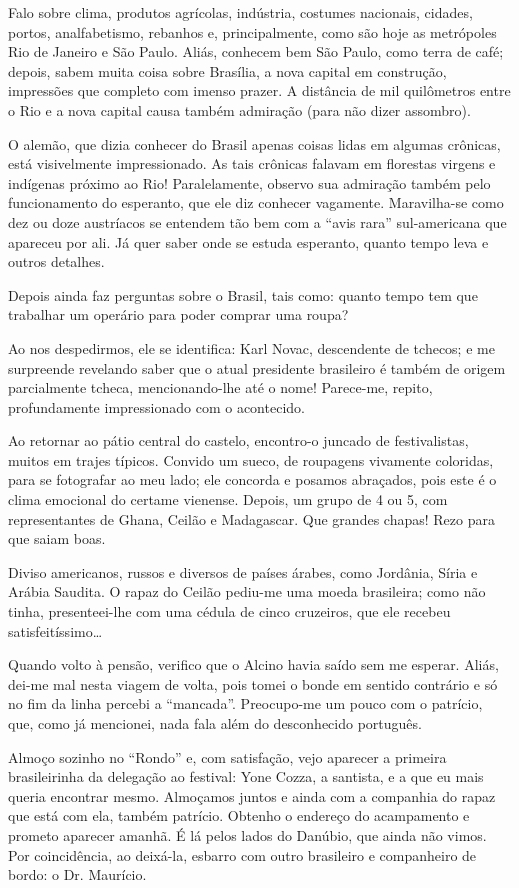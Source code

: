 Falo sobre clima, produtos agrícolas, indústria, costumes nacionais, cidades, portos, analfabetismo, rebanhos e, principalmente, como são hoje as metrópoles Rio de Janeiro e São Paulo. Aliás, conhecem bem São Paulo, como terra de café; depois, sabem muita coisa sobre Brasília, a nova capital em construção, impressões que completo com imenso prazer. A distância de mil quilômetros entre o Rio e a nova capital causa também admiração (para não dizer assombro).

O alemão, que dizia conhecer do Brasil apenas coisas lidas em algumas crônicas, está visivelmente impressionado. As tais crônicas falavam em florestas virgens e indígenas próximo ao Rio! Paralelamente, observo sua admiração também pelo funcionamento do esperanto, que ele diz conhecer vagamente. Maravilha-se como dez ou doze austríacos se entendem tão bem com a ``avis rara'' sul-americana que apareceu por ali. Já quer saber onde se estuda esperanto, quanto tempo leva e outros detalhes.

Depois ainda faz perguntas sobre o Brasil, tais como: quanto tempo tem que trabalhar um operário para poder comprar uma roupa?

Ao nos despedirmos, ele se identifica: Karl Novac, descendente de tchecos; e me surpreende revelando saber que o atual presidente brasileiro é também de origem parcialmente tcheca, mencionando-lhe até o nome! Parece-me, repito, profundamente impressionado com o acontecido.

Ao retornar ao pátio central do castelo, encontro-o juncado de festivalistas, muitos em trajes típicos. Convido um sueco, de roupagens vivamente coloridas, para se fotografar ao meu lado; ele concorda e posamos abraçados, pois este é o clima emocional do certame vienense. Depois, um grupo de 4 ou 5, com representantes de Ghana, Ceilão e Madagascar. Que grandes chapas! Rezo para que saiam boas.

Diviso americanos, russos e diversos de países árabes, como Jordânia, Síria e Arábia Saudita. O rapaz do Ceilão pediu-me uma moeda brasileira; como não tinha, presenteei-lhe com uma cédula de cinco cruzeiros, que ele recebeu satisfeitíssimo\ldots

Quando volto à pensão, verifico que o Alcino havia saído sem me esperar. Aliás, dei-me mal nesta viagem de volta, pois tomei o bonde em sentido contrário e só no fim da linha percebi a ``mancada''. Preocupo-me um pouco com o patrício, que, como já mencionei, nada fala além do desconhecido português.

Almoço sozinho no ``Rondo'' e, com satisfação, vejo aparecer a primeira brasileirinha da delegação ao festival: Yone Cozza, a santista, e a que eu mais queria encontrar mesmo. Almoçamos juntos e ainda com a companhia do rapaz que está com ela, também patrício. Obtenho o endereço do acampamento e prometo aparecer amanhã. É lá pelos lados do Danúbio, que ainda não vimos. Por coincidência, ao deixá-la, esbarro com outro brasileiro e companheiro de bordo: o Dr. Maurício.

